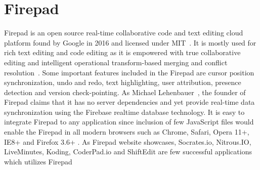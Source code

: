 \section{Firepad}

Firepad is an open source real-time collaborative code and text
editing cloud platform found by Google in 2016 and licensed under
MIT~\cite{hid-sp18-409-www-firepad}.  It is mostly used for rich text
editing and code editing as it is empowered with true collaborative
editing and intelligent operational transform-based merging and
conflict resolution~\cite{hid-sp18-409-www-firepad-wikipedia}. Some
important features included in the Firepad are cursor position
synchronization, undo and redo, text highlighting, user attribution,
presence detection and version check-pointing. As Michael
Lehenbauer~\cite{hid-sp18-409-www-firepad}, the founder of Firepad
claims that it has no server dependencies and yet provide real-time
data synchronization using the Firebase realtime database technology.
It is easy to integrate Firepad to any application since inclusion of
few JavaScript files would enable the Firepad in all modern browsers
such as Chrome, Safari, Opera 11+, IE8+ and Firefox 3.6+
\cite{hid-sp18-409-www-firepad}. As Firepad website showcases,
Socrates.io, Nitrous.IO, LiveMinutes, Koding, CoderPad.io and
ShiftEdit are few successful applications which utilizes
Firepad~\cite{hid-sp18-409-www-databricks}
